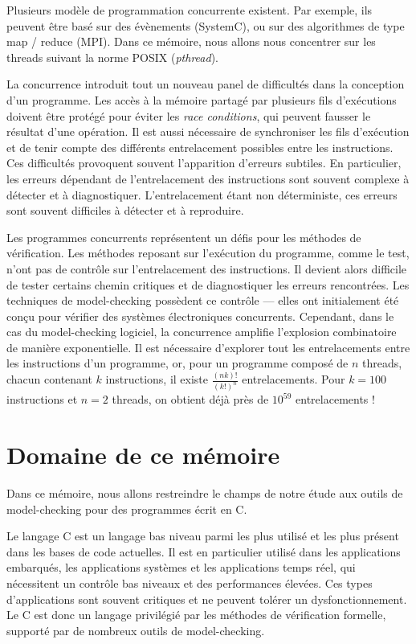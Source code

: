 Plusieurs modèle de programmation concurrente existent. Par exemple, ils
peuvent être basé sur des évènements (SystemC), ou sur des algorithmes
de type map / reduce (MPI). Dans ce mémoire, nous allons nous concentrer
sur les threads suivant la norme POSIX (\emph{pthread}).

La concurrence introduit tout un nouveau panel de difficultés dans la
conception d'un programme. Les accès à la mémoire partagé par plusieurs
fils d'exécutions doivent être protégé pour éviter les \emph{race
conditions}, qui peuvent fausser le résultat d'une opération. Il est
aussi nécessaire de synchroniser les fils d'exécution et de tenir compte
des différents entrelacement possibles entre les instructions. Ces
difficultés provoquent souvent l'apparition d'erreurs subtiles. En
particulier, les erreurs dépendant de l'entrelacement des instructions
sont souvent complexe à détecter et à diagnostiquer. L'entrelacement
étant non déterministe, ces erreurs sont souvent difficiles à détecter
et à reproduire.

Les programmes concurrents représentent un défis pour les méthodes de
vérification. Les méthodes reposant sur l'exécution du programme, comme
le test, n'ont pas de contrôle sur l'entrelacement des instructions. Il
devient alors difficile de tester certains chemin critiques et de
diagnostiquer les erreurs rencontrées. Les techniques de model-checking
possèdent ce contrôle --- elles ont initialement été conçu pour vérifier
des systèmes électroniques concurrents. Cependant, dans le cas du
model-checking logiciel, la concurrence amplifie l'explosion
combinatoire de manière exponentielle. Il est nécessaire d'explorer tout
les entrelacements entre les instructions d'un programme, or, pour un
programme composé de \(n\) threads, chacun contenant \(k\) instructions,
il existe \(\frac{(nk)!}{(k!)^n}\) entrelacements. Pour \(k = 100\)
instructions et \(n = 2\) threads, on obtient déjà près de \(10^{59}\)
entrelacements !

\section{Domaine de ce mémoire}

Dans ce mémoire, nous allons restreindre le champs de notre étude aux
outils de model-checking pour des programmes écrit en C.

Le langage C est un langage bas niveau parmi les plus utilisé et les
plus présent dans les bases de code actuelles. Il est en particulier
utilisé dans les applications embarqués, les applications systèmes et
les applications temps réel, qui nécessitent un contrôle bas niveaux et
des performances élevées. Ces types d'applications sont souvent
critiques et ne peuvent tolérer un dysfonctionnement. Le C est donc un
langage privilégié par les méthodes de vérification formelle, supporté
par de nombreux outils de model-checking.

